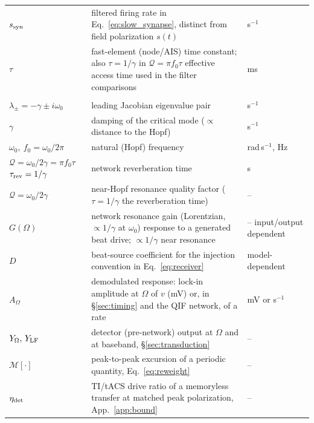 \documentclass[11pt,a4paper]{article}
\providecommand{\DIFaddtex}[1]{{\protect\color{blue} \sf #1}} %
\providecommand{\DIFdeltex}[1]{{\protect\color{red} \scriptsize #1}} %
\providecommand{\DIFaddbegin}{} %
\providecommand{\DIFaddend}{} %
\providecommand{\DIFdelbegin}{} %
\providecommand{\DIFdelend}{} %
\providecommand{\DIFadd}[1]{\texorpdfstring{\DIFaddtex{#1}}{#1}} %
\providecommand{\DIFdel}[1]{\texorpdfstring{\DIFdeltex{#1}}{}} %
\begin{document}
{\begin{longtable}{@{}>{\raggedright\arraybackslash}p{} >{\raggedright\arraybackslash}p{} >{\raggedright\arraybackslash}p{}@{}}
\DIFadd{$s_{\rm syn}$ }& \DIFadd{filtered firing rate in Eq.~\eqref{eq:slow_synapse}, distinct from field polarization $s(t)$ }& \DIFadd{s$^{-1}$ }\\
\DIFaddend $\tau$ & \DIFdelbegin \DIFdel{fast-element (node/AIS) time constant; also $\tau=1/\gamma$ in $\mathcal{Q}=\pi f_0\tau$ }\DIFdelend \DIFaddbegin \DIFadd{effective access time used in the filter comparisons }\DIFaddend & ms \\
\midrule \multicolumn{3}{@{}l}{\textit{Network dynamics, response, and bifurcation}} \\*
$\lambda_\pm=-\gamma\pm i\omega_0$ & leading Jacobian eigenvalue pair & s$^{-1}$ \\
$\gamma$ & damping of the critical mode ($\propto$ distance to the Hopf) & s$^{-1}$ \\
$\omega_0,\ f_0\!=\!\omega_0/2\pi$ & natural (Hopf) frequency & rad\,s$^{-1}$, Hz \\
\DIFdelbegin \DIFdel{$\mathcal{Q}=\omega_0/2\gamma=\pi f_0\tau$ }\DIFdelend \DIFaddbegin \DIFadd{$\tau_{\rm rev}=1/\gamma$ }\DIFaddend & \DIFaddbegin \DIFadd{network reverberation time }& \DIFadd{s }\\
\DIFadd{$\mathcal{Q}=\omega_0/2\gamma$ }& \DIFadd{near-Hopf }\DIFaddend resonance quality factor \DIFdelbegin \DIFdel{($\tau=1/\gamma$ the reverberation time) }\DIFdelend & -- \\
$G(\Omega)$ & \DIFdelbegin \DIFdel{network resonance gain (Lorentzian, $\propto\!1/\gamma$ at $\omega_0$) }\DIFdelend \DIFaddbegin \DIFadd{response to a generated beat drive; $\propto1/\gamma$ near resonance }\DIFaddend & \DIFdelbegin \DIFdel{-- }\DIFdelend \DIFaddbegin \DIFadd{input/output dependent }\DIFaddend \\
\DIFaddbegin \DIFadd{$D$ }& \DIFadd{beat-source coefficient for the injection convention in Eq.~\eqref{eq:receiver} }& \DIFadd{model-dependent }\\
\DIFaddend $A_\Omega$ & demodulated response: lock-in amplitude at $\Omega$ of $v$ (mV) or, in \S\ref{sec:timing} and the QIF network, of a rate & mV or s$^{-1}$ \\
$Y_\Omega,\,Y_{\rm LF}$ & detector (pre-network) output at $\Omega$ and at baseband, \S\ref{sec:transduction} & -- \\
$\mathcal{M}[\cdot]$ & peak-to-peak excursion of a periodic quantity, Eq.~\eqref{eq:reweight} & -- \\
$\eta_{\rm det}$ & TI/tACS drive ratio of a memoryless transfer at matched peak polarization, App.~\ref{app:bound} & -- \\

\end{longtable}}
\end{document}
